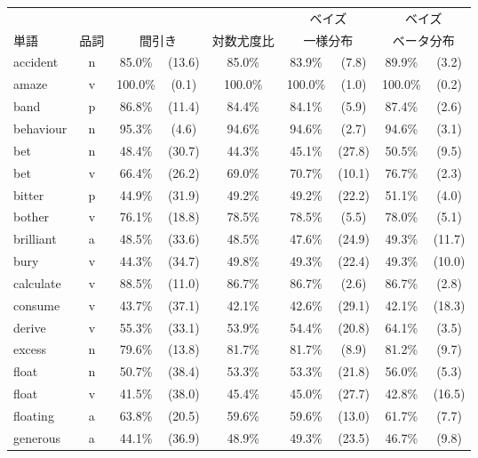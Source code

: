 \begin{table*}
  \label{tab:basic}
\begin{center}
\renewcommand{\arraystretch}{}
\begin{tabular}{l|c|cc|c|cc|cc} \hline
     &       &   &         &           & \multicolumn{2}{c|}{ベイズ} & \multicolumn{2}{c}{ベイズ}   \\
単語 & 品詞  & \multicolumn{2}{c|}{間引き}     & 対数尤度比 & \multicolumn{2}{c|}{一様分布} & \multicolumn{2}{c}{ベータ分布} \\
\hline
  accident & n  & 85.0\% & (13.6) & 85.0\% & 83.9\% & (7.8) & 89.9\% & (3.2) \\
     amaze & v  & 100.0\% & (0.1) & 100.0\% & 100.0\% & (1.0) & 100.0\% & (0.2) \\
      band & p  & 86.8\% & (11.4)  & 84.4\%  & 84.1\% & (5.9) & 87.4\% & (2.6) \\
 behaviour & n  & 95.3\% & (4.6) & 94.6\%  & 94.6\% & (2.7) & 94.6\% & (3.1) \\
       bet & n  & 48.4\% & (30.7)  & 44.3\%  & 45.1\% & (27.8) & 50.5\% & (9.5) \\
       bet & v  & 66.4\% & (26.2) & 69.0\%  & 70.7\% & (10.1) & 76.7\% & (2.3) \\
    bitter & p  & 44.9\% & (31.9) & 49.2\%  & 49.2\% & (22.2) & 51.1\% & (4.0) \\
    bother & v  & 76.1\% & (18.8) & 78.5\%  & 78.5\% & (5.5) & 78.0\% & (5.1) \\
 brilliant & a  & 48.5\% & (33.6) & 48.5\%  & 47.6\% & (24.9) & 49.3\% & (11.7) \\
      bury & v  & 44.3\% & (34.7) & 49.8\%  & 49.3\% & (22.4) & 49.3\% & (10.0) \\
 calculate & v  & 88.5\% & (11.0) & 86.7\%  & 86.7\% & (2.6) & 86.7\% & (2.8) \\
   consume & v  & 43.7\% & (37.1) & 42.1\%  & 42.6\% & (29.1) & 42.1\% & (18.3) \\
    derive & v  & 55.3\% & (33.1) & 53.9\%  & 54.4\% & (20.8) & 64.1\% & (3.5) \\
    excess & n  & 79.6\% & (13.8) & 81.7\%  & 81.7\% & (8.9) & 81.2\% & (9.7) \\
     float & n  & 50.7\% & (38.4) & 53.3\%  & 53.3\% & (21.8) & 56.0\% & (5.3) \\
     float & v  & 41.5\% & (38.0) & 45.4\%  & 45.0\% & (27.7) & 42.8\% & (16.5) \\
  floating & a  & 63.8\% & (20.5) & 59.6\%  & 59.6\% & (13.0) & 61.7\% & (7.7) \\
  generous & a  & 44.1\% & (36.9) & 48.9\%  & 49.3\% & (23.5) & 46.7\% & (9.8) \\

\end{tabular}
\end{center}
\end{table*}
